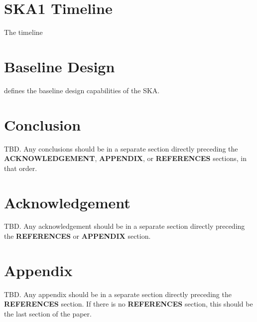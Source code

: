 \documentclass[a4paper,
               biblatex,       %
               keeplastbox,    %
               ]{jacow-2_1}    %
\newcommand\SEC[1]{\textbf{\uppercase{#1}}}
\begin{document}


\section{SKA1 Timeline} %
\label{sec:ska1_timeline}
The timeline 

\section{Baseline Design} %
\label{sec:baseline_design}

\cite{SKA-TEL-SKO-0000002_v3} defines the baseline 
design capabilities of the SKA.



\section{Conclusion} %
\label{sec:conclusion}
TBD. Any conclusions should be in a separate section directly preceding
the \SEC{Acknowledgement}, \SEC{Appendix}, or \SEC{References} sections, in that
order.


\section{Acknowledgement} %
\label{sec:acknowledgement}
TBD. Any acknowledgement should be in a separate section directly preceding
the \SEC{References} or \SEC{Appendix} section.


\section{Appendix} %
\label{sec:appendix}
TBD. Any appendix should be in a separate section directly preceding
the \SEC{References} section. If there is no \SEC{References} section,
this should be the last section of the paper.



\label{sec:references}
\printbibliography

\end{document}
